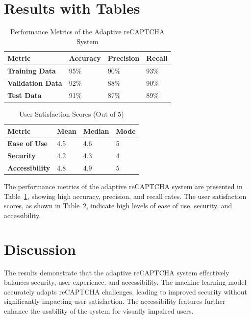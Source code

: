 \documentclass{article}
\begin{document}
\section{Results with Tables}
\begin{table}[ht]
\centering
\caption{Performance Metrics of the Adaptive reCAPTCHA System}
\label{tab:performance_metrics}
\begin{tabular}{@{}llll@{}}
\toprule
\textbf{Metric} & \textbf{Accuracy} & \textbf{Precision} & \textbf{Recall} \\
\midrule
\textbf{Training Data} & 95\% & 90\% & 93\% \\
\textbf{Validation Data} & 92\% & 88\% & 90\% \\
\textbf{Test Data} & 91\% & 87\% & 89\% \\
\bottomrule
\end{tabular}
\end{table}

\begin{table}[ht]
\centering
\caption{User Satisfaction Scores (Out of 5)}
\label{tab:user_satisfaction}
\begin{tabular}{@{}llll@{}}
\toprule
\textbf{Metric} & \textbf{Mean} & \textbf{Median} & \textbf{Mode} \\
\midrule
\textbf{Ease of Use} & 4.5 & 4.6 & 5 \\
\textbf{Security} & 4.2 & 4.3 & 4 \\
\textbf{Accessibility} & 4.8 & 4.9 & 5 \\
\bottomrule
\end{tabular}
\end{table}

The performance metrics of the adaptive reCAPTCHA system are presented in Table~\ref{tab:performance_metrics}, showing high accuracy, precision, and recall rates. The user satisfaction scores, as shown in Table~\ref{tab:user_satisfaction}, indicate high levels of ease of use, security, and accessibility.

\section{Discussion}
The results demonstrate that the adaptive reCAPTCHA system effectively balances security, user experience, and accessibility. The machine learning model accurately adapts reCAPTCHA challenges, leading to improved security without significantly impacting user satisfaction. The accessibility features further enhance the usability of the system for visually impaired users.
\end{document}
